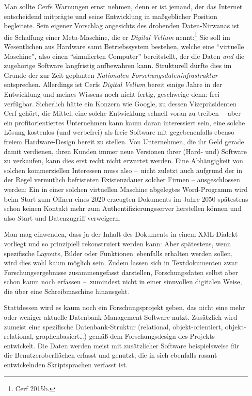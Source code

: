 \documentclass[a4paper,
fontsize=11pt,
oneside,
numbers=noperiodatend,
parskip=half-,
bibliography=totoc,
final
]{scrartcl}
\begin{document}
Man sollte Cerfs Warnungen ernst nehmen, denn er ist jemand, der das
Internet entscheidend mitprägte und seine Entwicklung in maßgeblicher
Position begleitete. Sein eigener Vorschlag angesichts des drohenden
Daten-Nirwanas ist die Schaffung einer Meta-Maschine, die er
\emph{Digital Vellum} nennt:\footnote{Cerf 2015b.} Sie soll im
Wesentlichen aus Hardware samt Betriebssystem bestehen, welche eine
\enquote{virtuelle Maschine}, also einen \enquote{simulierten Computer}
bereitstellt, der die Daten \emph{und} die zugehörige Software
langfristig aufbewahren kann. Strukturell dürfte dies im Grunde der zur
Zeit geplanten \emph{Nationalen Forschungsdateninfrastruktur}
entsprechen. Allerdings ist Cerfs \emph{Digital Vellum} bereit einige
Jahre in der Entwicklung und meines Wissens noch nicht fertig,
geschweige denn: frei verfügbar. Sicherlich hätte ein Konzern wie
Google, zu dessen Vizepräsidenten Cerf gehört, die Mittel, eine solche
Entwicklung schnell voran zu treiben --~aber ein profitorientiertes
Unternehmen kann kaum daran interessiert sein, eine solche Lösung
kostenlos (und werbefrei) als freie Software mit gegebenenfalls ebenso
freiem Hardware-Design bereit zu stellen. Von Unternehmen, die ihr Geld
gerade damit verdienen, ihren Kunden immer neue Versionen ihrer (Hard-
und) Software zu verkaufen, kann dies erst recht nicht erwartet werden.
Eine Abhängigkeit von solchen kommerziellen Interessen muss also
--~nicht zuletzt auch aufgrund der in der Regel vermutlich befristeten
Existenzdauer solcher Firmen -- ausgeschlossen werden: Ein in einer
solchen virtuellen Maschine abgelegtes Word-Programm wird beim Start zum
Öffnen eines 2020 erzeugten Dokuments im Jahre 2050 spätestens schon
keinen Kontakt mehr zum Authentifizierungsserver herstellen können und
also Start und Datenzugriff verweigern.

Man mag einwenden, dass ja der Inhalt des Dokuments in einem XML-Dialekt
vorliegt und so prinzipiell rekonstruiert werden kann: Aber spätestens,
wenn spezifische Layouts, Bilder oder Funktionen~ebenfalls erhalten
werden sollen, wird dies wohl kaum möglich sein. Zudem lassen sich in
Textdokumenten zwar Forschungsergebnisse zusammengefasst darstellen,
Forschungsdaten selbst aber schon kaum noch erfassen --~zumindest nicht
in einer sinnvollen digitalen Weise, die über eine Schreibmaschine
hinausgeht.

Stattdessen wird es kaum noch ein Forschungsprojekt geben, das nicht
eine mehr oder weniger aktuelle Datenbank-Management-Software nutzt.
Zusätzlich wird zumeist eine spezifische Datenbank-Struktur (relational,
objekt-orientiert, objekt-relational, graphenbasiert\ldots) gemäß dem
Forschungsdesign des Projekts entwickelt. Die Daten werden meist mit
zusätzlicher Software beispielsweise für die Benutzeroberflächen erfasst
und genutzt, die in sich ebenfalls rasant entwickelnden Skriptsprachen
verfasst ist.
\end{document}
